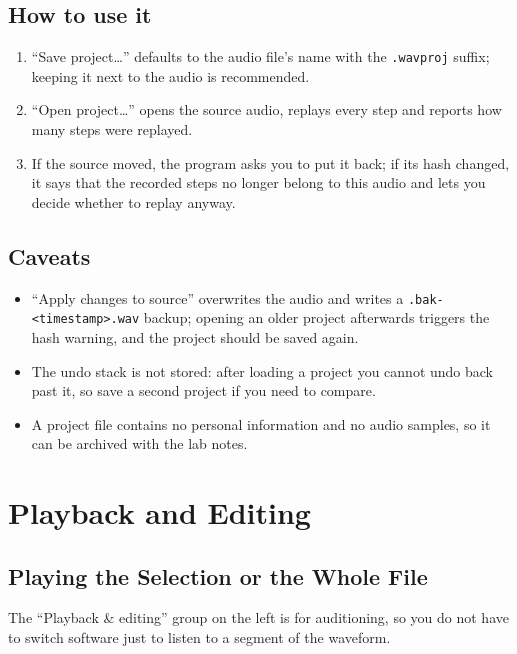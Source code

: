 \documentclass[UTF8,a4paper,12pt]{ctexart}
\begin{document}
\subsection{How to use it}

\begin{enumerate}[leftmargin=2em]
  \item ``Save project…'' defaults to the audio file's name with the \texttt{.wavproj} suffix; keeping it next to the audio is recommended.
  \item ``Open project…'' opens the source audio, replays every step and reports how many steps were replayed.
  \item If the source moved, the program asks you to put it back; if its hash changed, it says that the recorded steps no longer belong to this audio and lets you decide whether to replay anyway.
\end{enumerate}

\subsection{Caveats}

\begin{itemize}[leftmargin=2em]
  \item ``Apply changes to source'' overwrites the audio and writes a \texttt{.bak-<timestamp>.wav} backup; opening an older project afterwards triggers the hash warning, and the project should be saved again.
  \item The undo stack is not stored: after loading a project you cannot undo back past it, so save a second project if you need to compare.
  \item A project file contains no personal information and no audio samples, so it can be archived with the lab notes.
\end{itemize}

\section{Playback and Editing}

\subsection{Playing the Selection or the Whole File}

The ``Playback \& editing'' group on the left is for auditioning, so you do not have to switch software just to listen to a segment of the waveform.
\end{document}
